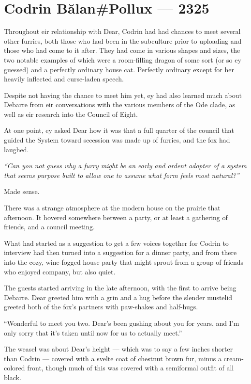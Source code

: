 \hypertarget{codrin-bux103lanpollux-2325}{%
\chapter{Codrin Bălan\#Pollux — 2325}\label{codrin-bux103lanpollux-2325}}

Throughout eir relationship with Dear, Codrin had had chances to meet several other furries, both those who had been in the subculture prior to uploading and those who had come to it after. They had come in various shapes and sizes, the two notable examples of which were a room-filling dragon of some sort (or so ey guessed) and a perfectly ordinary house cat. Perfectly ordinary except for her heavily inflected and curse-laden speech.

Despite not having the chance to meet him yet, ey had also learned much about Debarre from eir conversations with the various members of the Ode clade, as well as eir research into the Council of Eight.

At one point, ey asked Dear how it was that a full quarter of the council that guided the System toward secession was made up of furries, and the fox had laughed.

\emph{``Can you not guess why a furry might be an early and ardent adopter of a system that seems purpose built to allow one to assume what form feels most natural?''}

Made sense.

There was a strange atmosphere at the modern house on the prairie that afternoon. It hovered somewhere between a party, or at least a gathering of friends, and a council meeting.

What had started as a suggestion to get a few voices together for Codrin to interview had then turned into a suggestion for a dinner party, and from there into the cozy, wine-fogged house party that might sprout from a group of friends who enjoyed company, but also quiet.

The guests started arriving in the late afternoon, with the first to arrive being Debarre. Dear greeted him with a grin and a hug before the slender mustelid greeted both of the fox's partners with paw-shakes and half-hugs.

``Wonderful to meet you two. Dear's been gushing about you for years, and I'm only sorry that it's taken until now for us to actually meet.''

The weasel was about Dear's height — which was to say a few inches shorter than Codrin — covered with a svelte coat of chestnut brown fur, minus a cream-colored front, though much of this was covered with a semiformal outfit of all black.

